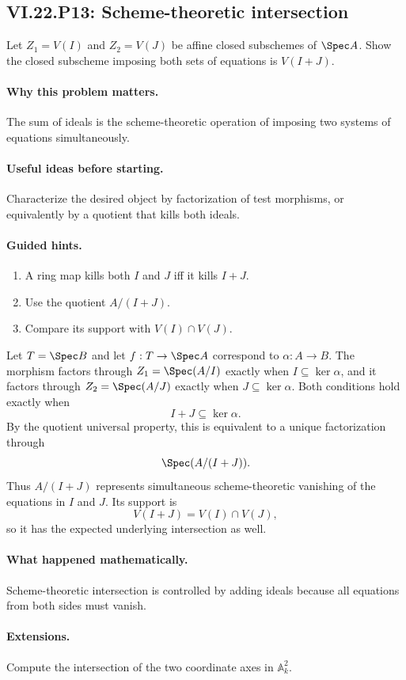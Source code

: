 \subsection*{VI.22.P13: Scheme-theoretic intersection}
\begin{problem}\label{prob:vi22-p13}
Let $Z_1=V(I)$ and $Z_2=V(J)$ be affine closed subschemes of $\Spec A$.  Show the closed subscheme imposing both sets of equations is $V(I+J)$.
\end{problem}

\ifdefined\FullProblemDossiers
\paragraph{Why this problem matters.}
The sum of ideals is the scheme-theoretic operation of imposing two systems of equations simultaneously.

\paragraph{Useful ideas before starting.}
Characterize the desired object by factorization of test morphisms, or equivalently by a quotient that kills both ideals.

\paragraph{Guided hints.}
\begin{enumerate}
\item A ring map kills both $I$ and $J$ iff it kills $I+J$.
\item Use the quotient $A/(I+J)$.
\item Compare its support with $V(I)\cap V(J)$.
\end{enumerate}

\begin{solution}
Let $T=\Spec B$ and let $f:T\to\Spec A$ correspond to
$\alpha:A\to B$.  The morphism factors through $Z_1=\Spec(A/I)$ exactly when
$I\subseteq\ker\alpha$, and it factors through $Z_2=\Spec(A/J)$ exactly when
$J\subseteq\ker\alpha$.  Both conditions hold exactly when
\[
 I+J\subseteq\ker\alpha.
\]
By the quotient universal property, this is equivalent to a unique factorization through
\[
 \Spec(A/(I+J)).
\]
Thus $A/(I+J)$ represents simultaneous scheme-theoretic vanishing of the equations in $I$ and
$J$.  Its support is
\[
 V(I+J)=V(I)\cap V(J),
\]
so it has the expected underlying intersection as well.
\end{solution}

\paragraph{What happened mathematically.}
Scheme-theoretic intersection is controlled by adding ideals because all equations from both sides must vanish.

\paragraph{Extensions.}
Compute the intersection of the two coordinate axes in $\mathbb A^2_k$.
\fi
